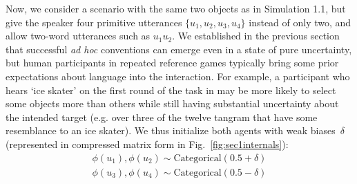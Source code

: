Now, we consider a scenario with the same two objects as in Simulation 1.1, but give the speaker four primitive utterances $\{u_1, u_2, u_3, u_4\}$ instead of only two, and allow two-word utterances such as $u_1u_2$.
We established in the previous section that successful \emph{ad hoc} conventions can emerge even in a state of pure uncertainty, but human participants in repeated reference games typically bring some prior expectations about language into the interaction.
For example, a participant who hears `ice skater' on the first round of the task in  may be more likely to select some objects more than others while still having substantial uncertainty about the intended target (e.g. over three of the twelve tangram that have some resemblance to an ice skater).
We thus initialize both agents with weak biases $\delta$ (represented in compressed matrix form in Fig.~\ref{fig:sec1internals}):
\begin{align}
\phi(u_1), \phi(u_2) \sim \textrm{Categorical}(0.5 + \delta) \nonumber\\
\phi(u_3), \phi(u_4) \sim \textrm{Categorical}(0.5 - \delta) \nonumber
\end{align}



